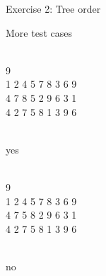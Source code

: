 \documentclass{beamer}
\begin{document}
\begin{frame}{Exercise 2: Tree order}

  \begin{exampleblock}{More test cases}
    \begin{minipage}[t]{0.3\linewidth}
    \\9\\1 2 4 5 7 8 3 6 9\\4 7 8 5 2 9 6 3 1\\4 2 7 5 8 1 3 9 6
    
    \medskip
    \\yes
    \end{minipage}
    \begin{minipage}[t]{0.3\linewidth}
    \\9\\1 2 4 5 7 8 3 6 9\\4 7 5 8 2 9 6 3 1\\4 2 7 5 8 1 3 9 6
    
    \medskip
    \\no
    \end{minipage}
  \end{exampleblock}
\end{frame}
\end{document}
